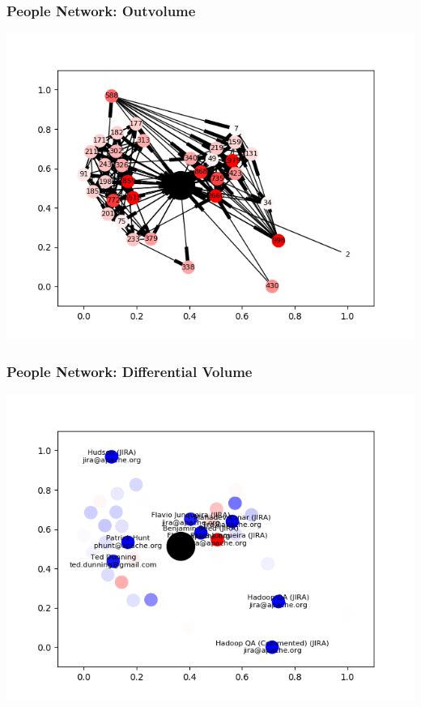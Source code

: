 \documentclass{beamer}
\begin{document}
\begin{frame}\frametitle{People Network: Outvolume}
\centering
\includegraphics[width=\textwidth]{graph7.png}
\end{frame}
\begin{frame}\frametitle{People Network: Differential Volume}
\centering
\includegraphics[width=\textwidth]{graph8.png}
\end{frame}
\end{document}
